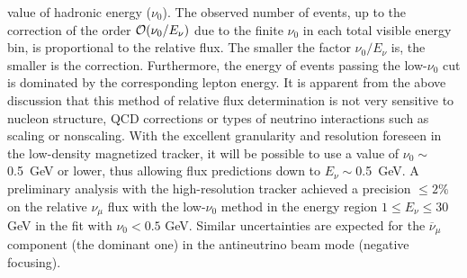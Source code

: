 value of hadronic energy ($\nu_0$).  The observed number of events, up
to the correction of the order ${\cal O} (\nu_0/E_\nu)$ due to the
finite $\nu_0$ in each total visible energy bin, is proportional to
the relative flux. The smaller the factor $\nu_0/E_\nu$ is, the smaller
is the correction.  Furthermore, the energy of events passing the
low-$\nu_0$ cut is dominated by the corresponding lepton energy. 
It is
apparent from the above discussion that this method of relative flux
determination is not very sensitive to nucleon structure, QCD
corrections or types of neutrino interactions such as scaling or
nonscaling. With the excellent granularity and resolution foreseen in
the low-density magnetized tracker, it will be possible to use a value
of $\nu_0\sim$\SI{0.5}{\GeV} or lower, thus allowing flux predictions down to
$E_\nu \sim$\SI{0.5}{\GeV}. A preliminary analysis with the high-resolution
tracker achieved a precision $\leq 2\%$ on the relative $\nu_\mu$
flux with the low-$\nu_0$ method in the energy region $1 \leq E_\nu
\leq 30$ \si{GeV} in the fit with $\nu_0 < 0.5$ \si{\GeV}. Similar uncertainties
are expected for the $\overline{\nu}_\mu$ component (the dominant one) in
the antineutrino beam mode (negative focusing).
